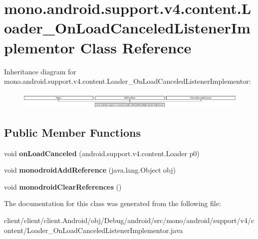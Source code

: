 \hypertarget{classmono_1_1android_1_1support_1_1v4_1_1content_1_1Loader__OnLoadCanceledListenerImplementor}{}\section{mono.\+android.\+support.\+v4.\+content.\+Loader\+\_\+\+On\+Load\+Canceled\+Listener\+Implementor Class Reference}
\label{classmono_1_1android_1_1support_1_1v4_1_1content_1_1Loader__OnLoadCanceledListenerImplementor}
Inheritance diagram for mono.\+android.\+support.\+v4.\+content.\+Loader\+\_\+\+On\+Load\+Canceled\+Listener\+Implementor\+:\begin{figure}[H]
\begin{center}
\leavevmode
\includegraphics[height=0.797721cm]{classmono_1_1android_1_1support_1_1v4_1_1content_1_1Loader__OnLoadCanceledListenerImplementor}
\end{center}
\end{figure}
\subsection*{Public Member Functions}
\begin{DoxyCompactItemize}
\item 
\hypertarget{classmono_1_1android_1_1support_1_1v4_1_1content_1_1Loader__OnLoadCanceledListenerImplementor_a30211744da81687fe1fcdea96162b15d}{}void {\bfseries on\+Load\+Canceled} (android.\+support.\+v4.\+content.\+Loader p0)\label{classmono_1_1android_1_1support_1_1v4_1_1content_1_1Loader__OnLoadCanceledListenerImplementor_a30211744da81687fe1fcdea96162b15d}

\item 
\hypertarget{classmono_1_1android_1_1support_1_1v4_1_1content_1_1Loader__OnLoadCanceledListenerImplementor_a5e5e1c8f0bda08b7e26819e4ee995873}{}void {\bfseries monodroid\+Add\+Reference} (java.\+lang.\+Object obj)\label{classmono_1_1android_1_1support_1_1v4_1_1content_1_1Loader__OnLoadCanceledListenerImplementor_a5e5e1c8f0bda08b7e26819e4ee995873}

\item 
\hypertarget{classmono_1_1android_1_1support_1_1v4_1_1content_1_1Loader__OnLoadCanceledListenerImplementor_a4eb6431594cba99ef29e0a08f9fb6904}{}void {\bfseries monodroid\+Clear\+References} ()\label{classmono_1_1android_1_1support_1_1v4_1_1content_1_1Loader__OnLoadCanceledListenerImplementor_a4eb6431594cba99ef29e0a08f9fb6904}

\end{DoxyCompactItemize}


The documentation for this class was generated from the following file\+:\begin{DoxyCompactItemize}
\item 
client/client/client.\+Android/obj/\+Debug/android/src/mono/android/support/v4/content/Loader\+\_\+\+On\+Load\+Canceled\+Listener\+Implementor.\+java\end{DoxyCompactItemize}
